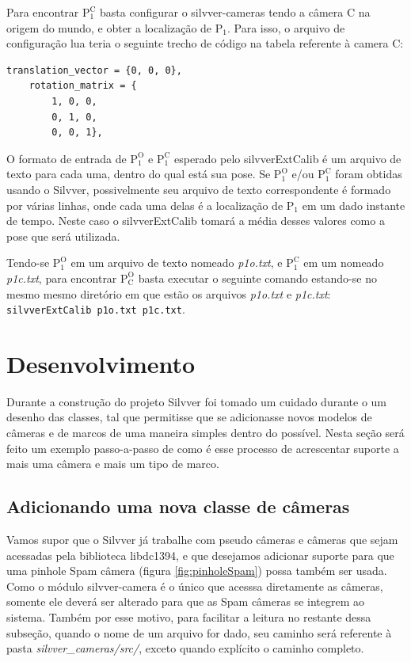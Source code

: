 \documentclass[a4paper,10pt]{article}
\begin{document}
Para encontrar $\mathrm{P_1^C}$ basta configurar o silvver-cameras tendo a
câmera C na origem do mundo, e obter a localização de $\mathrm{P_1}$. Para
isso, o arquivo de configuração lua teria o seguinte trecho de código na
tabela referente à camera C:
\begin{lstlisting}[numbers=none]
    translation_vector = {0, 0, 0},
    rotation_matrix = {
        1, 0, 0,
        0, 1, 0,
        0, 0, 1},
\end{lstlisting}

O formato de entrada de $\mathrm{P_1^O}$ e $\mathrm{P_1^C}$ esperado pelo
silvverExtCalib é um arquivo de texto para cada uma, dentro do qual está sua
pose. Se $\mathrm{P_1^O}$ e/ou $\mathrm{P_1^C}$ foram obtidas usando o
Silvver, possivelmente seu arquivo de texto correspondente é formado por
várias linhas, onde cada uma delas é a localização de $\mathrm{P_1}$ em um
dado instante de tempo. Neste caso o silvverExtCalib tomará a média desses
valores como a pose que será utilizada.

Tendo-se $\mathrm{P_1^O}$ em um arquivo de texto nomeado \emph{p1o.txt}, e
$\mathrm{P_1^C}$ em um nomeado \emph{p1c.txt}, para encontrar $\mathrm{P_C^O}$
basta executar o seguinte comando estando-se no mesmo mesmo diretório em que
estão os arquivos \emph{p1o.txt} e \emph{p1c.txt}: \texttt{silvverExtCalib
  p1o.txt p1c.txt}.

\section{Desenvolvimento}

Durante a construção do projeto Silvver foi tomado um cuidado durante o
um desenho das classes, tal que permitisse que se adicionasse novos modelos de
câmeras e de marcos de uma maneira simples dentro do possível. Nesta seção
será feito um exemplo passo-a-passo de como é esse processo de acrescentar
suporte a mais uma câmera e mais um tipo de marco.

\subsection{Adicionando uma nova classe de câmeras}


Vamos supor que o Silvver já trabalhe com pseudo câmeras e câmeras que sejam
acessadas pela biblioteca libdc1394, e que desejamos adicionar suporte para
que uma pinhole Spam câmera (figura \ref{fig:pinholeSpam}) possa também ser
usada. Como o módulo silvver-camera é o único que acesssa diretamente as
câmeras, somente ele deverá ser alterado para que as Spam câmeras se integrem
ao sistema. Também por esse motivo, para facilitar a leitura no restante dessa
subseção, quando o nome de um arquivo for dado, seu caminho será referente à pasta
\emph{silvver\_cameras/src/}, exceto quando explícito o caminho completo.
\end{document}
